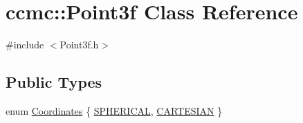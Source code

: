 \hypertarget{classccmc_1_1_point3f}{\section{ccmc\-:\-:Point3f Class Reference}
\label{classccmc_1_1_point3f}
}


{\ttfamily \#include $<$Point3f.\-h$>$}

\subsection*{Public Types}
\begin{DoxyCompactItemize}
\item 
enum \hyperlink{classccmc_1_1_point3f_a41ca3743444f541586ededdd77c9762b}{Coordinates} \{ \hyperlink{classccmc_1_1_point3f_a41ca3743444f541586ededdd77c9762ba3073829d678e4f6c2b8bc789e02a7ddc}{S\-P\-H\-E\-R\-I\-C\-A\-L}, 
\hyperlink{classccmc_1_1_point3f_a41ca3743444f541586ededdd77c9762ba844df4ee6d0801f5dd43bdb6a423e99e}{C\-A\-R\-T\-E\-S\-I\-A\-N}
 \}
\end{DoxyCompactItemize}
